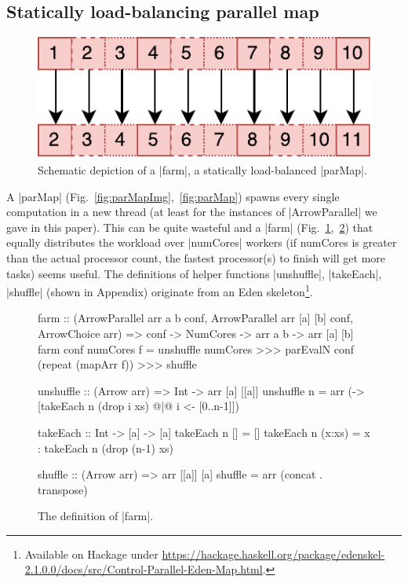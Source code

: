 \subsection{Statically load-balancing parallel map}
\begin{figure}[h]
	\includegraphics[scale=0.7]{images/farm}
	\caption{Schematic depiction of a |farm|, a statically
          load-balanced |parMap|.}
	\label{fig:farmImg}
\end{figure}
A |parMap| (Fig.~\ref{fig:parMapImg},~\ref{fig:parMap}) spawns every single computation in a new thread (at least for the instances of |ArrowParallel| we gave in this paper). This can be quite wasteful and a |farm| (Fig.~\ref{fig:farmImg},~\ref{fig:farm}) that equally distributes the workload over |numCores| workers (if numCores is greater than the actual processor count, the fastest processor(s) to finish will get more tasks) seems useful.
The definitions of helper functions |unshuffle|, |takeEach|, |shuffle| (shown in Appendix) originate from an Eden skeleton\footnote{Available on Hackage under \url{https://hackage.haskell.org/package/edenskel-2.1.0.0/docs/src/Control-Parallel-Eden-Map.html}.}.
\begin{figure}[h]
\begin{code}
farm :: (ArrowParallel arr a b conf,
	ArrowParallel arr [a] [b] conf, ArrowChoice arr) =>
	conf -> NumCores -> arr a b -> arr [a] [b]
farm conf numCores f =
	unshuffle numCores >>>
	parEvalN conf (repeat (mapArr f)) >>>
	shuffle

unshuffle :: (Arrow arr) => Int -> arr [a] [[a]]
unshuffle n = arr (\xs -> [takeEach n (drop i xs) @|@ i <- [0..n-1]])

takeEach :: Int -> [a] -> [a]
takeEach n [] = []
takeEach n (x:xs) = x : takeEach n (drop (n-1) xs)

shuffle :: (Arrow arr) => arr [[a]] [a]
shuffle = arr (concat . transpose)
\end{code}
\caption{The definition of |farm|.}
\label{fig:farm}
\end{figure}

